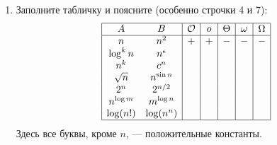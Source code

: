 \begin{enumerate}
\begin{enumerate}
\begin{proof}
        \begin{equation}
          f \preceq g \Leftrightarrow (f \prec g) \lor (f \sim g).
        \end{equation}
        \textit{В одну сторону}: если известно, что функция $f$ растет не быстрее, чем функция $g$, то это означает, что $f$ либо строго меньше $g$, либо равна $g$:
        \begin{equation}
          f \preceq g \Rightarrow (f \prec g) \lor (f \sim g).
        \end{equation}
        В обратную сторону: если известно, что функция $f$ или строго меньше функции $g$, или равна $g$, то это означает, что не превосходит (меньше либо равна) $g$:
        \begin{equation}
          (f \prec g) \lor (f \sim g) \Rightarrow f \preceq g.
        \end{equation}
        Так как было проведено доказательство в обе стороны, то можно ввести эквивалентность устверждений:
        \begin{equation}
          f \preceq g \Leftrightarrow (f \prec g) \lor (f \sim g).
        \end{equation}
      \end{proof}
    \end{enumerate}

  \item Заполните табличку и поясните (особенно строчки 4 и 7):
    $$
    \begin{array}{|cc|c|c|c|c|c|}
      \hline
      A & B & \mathcal{O} & o & \Theta & \omega & \Omega \\
      \hline
      n & n^2 & + & + & - & - & - \\
      \log^k n & n^{\epsilon} & & & & & \\
      n^k & c^n & & & & & \\
      \sqrt{n} & n^{\sin n} & & & & & \\
      2^n & 2^{n \slash 2} & & & & & \\
      n^{\log m} & m^{\log n} & & & & & \\
      \log (n!) & \log(n^n) & & & & & \\
      \hline
    \end{array}
    $$
    Здесь все буквы, кроме $n$, --- положительные константы.


\end{enumerate}

\clearpage
